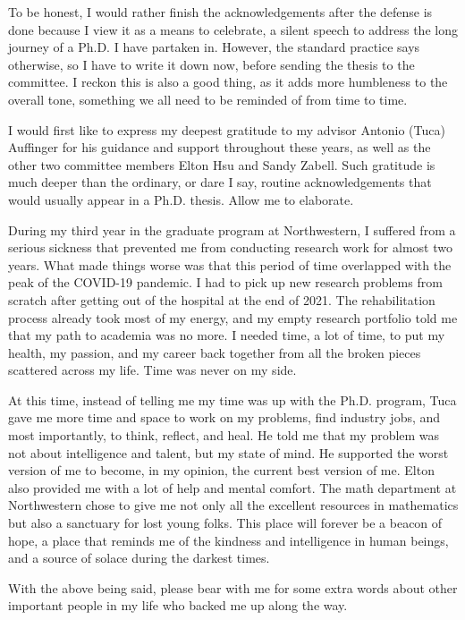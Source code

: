 \acknowledgements

To be honest, I would rather finish the acknowledgements after the defense is done because I view it as a means to celebrate, a silent speech to address the long journey of a Ph.D. I have partaken in. However, the standard practice says otherwise, so I have to write it down now, before sending the thesis to the committee. I reckon this is also a good thing, as it adds more humbleness to the overall tone, something we all need to be reminded of from time to time.

I would first like to express my deepest gratitude to my advisor Antonio (Tuca) Auffinger for his guidance and support throughout these years, as well as the other two committee members Elton Hsu and Sandy Zabell. Such gratitude is much deeper than the ordinary, or dare I say, routine acknowledgements that would usually appear in a Ph.D. thesis. Allow me to elaborate.

During my third year in the graduate program at Northwestern, I suffered from a serious sickness that prevented me from conducting research work for almost two years. What made things worse was that this period of time overlapped with the peak of the COVID-19 pandemic. I had to pick up new research problems from scratch after getting out of the hospital at the end of 2021. The rehabilitation process already took most of my energy, and my empty research portfolio told me that my path to academia was no more. I needed time, a lot of time, to put my health, my passion, and my career back together from all the broken pieces scattered across my life. Time was never on my side.

At this time, instead of telling me my time was up with the Ph.D. program, Tuca gave me more time and space to work on my problems, find industry jobs, and most importantly, to think, reflect, and heal. He told me that my problem was not about intelligence and talent, but my state of mind. He supported the worst version of me to become, in my opinion, the current best version of me. Elton also provided me with a lot of help and mental comfort. The math department at Northwestern chose to give me not only all the excellent resources in mathematics but also a sanctuary for lost young folks. This place will forever be a beacon of hope, a place that reminds me of the kindness and intelligence in human beings, and a source of solace during the darkest times.

With the above being said, please bear with me for some extra words about other important people in my life who backed me up along the way.

